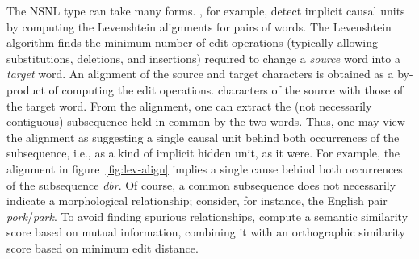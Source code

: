 
The NSNL type can take many forms. 
\cite{baroni-et-al:2002}, for example, detect implicit causal units by computing 
the Levenshtein alignments for pairs of words. 
The Levenshtein algorithm finds the minimum number of edit operations 
(typically allowing substitutions, deletions, and insertions) required to change 
a \textit{source} word into a \textit{target} word.
An alignment of the source and target characters is obtained as a by-product 
of computing the edit operations. 
characters of the source with those of the target word. 
From the alignment, one can extract the (not necessarily contiguous) 
subsequence held in common by the two words.
Thus, one may view the alignment as suggesting a single causal unit behind 
both occurrences of the subsequence, i.e., as a kind of implicit hidden unit, 
as it were.
For example, the alignment in figure~\ref{fig:lev-align} implies a single cause 
behind both occurrences of the subsequence \textit{dbr}.
Of course, a common subsequence does not necessarily indicate a 
morphological relationship; 
consider, for instance, the English pair \textit{pork}/\textit{park}. 
To avoid finding spurious relationships, 
\cite{baroni-et-al:2002} compute a semantic similarity score based on 
mutual information, 
combining it with an orthographic similarity score based on minimum 
edit distance.

